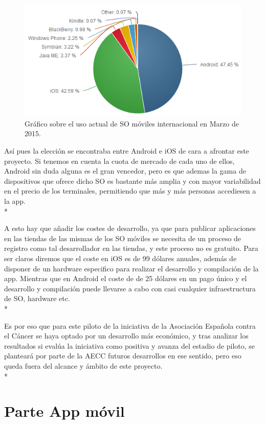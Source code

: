 \documentclass[../pfc.tex]{subfiles}
\begin{document}
	\begin{figure}[h]
		\centering
		\includegraphics[width=0.8\linewidth]{../images/usomoviles}
		\caption{Gráfico sobre el uso actual de SO móviles internacional en Marzo de 2015.}
		\label{fig:usomoviles}
	\end{figure}
	
	Así pues la elección se encontraba entre Android e iOS de cara a afrontar este proyecto. Si tenemos en cuenta la cuota de mercado de cada uno de ellos, Android sin duda alguna es el gran vencedor, pero es que ademas la gama de dispositivos que ofrece dicho SO es bastante más amplia y con mayor variabilidad en el precio de los terminales, permitiendo que más y más personas accediesen a la app. \\*
	
	A esto hay que añadir los costes de desarrollo, ya que para publicar aplicaciones en las tiendas de las mismas de los SO móviles se necesita de un proceso de registro como tal desarrollador en las tiendas, y este proceso no es gratuito. Para ser claros diremos que el coste en iOS es de 99 dólares anuales, además de disponer de un hardware especifico para realizar el desarrollo y compilación de la app. Mientras que en Android el coste de de 25 dólares en un pago único y el desarrollo y compilación puede llevarse a cabo con casi cualquier infraestructura de SO, hardware etc. \\*
	
	Es por eso que para este piloto de la iniciativa de la Asociación Española contra el Cáncer se haya optado por un desarrollo más económico, y tras analizar los resultados si evalúa la iniciativa como positiva y avanza del estadio de piloto, se planteará por parte de la AECC futuros desarrollos en ese sentido, pero eso queda fuera del alcance y ámbito de este proyecto.\\*

	\section{Parte App móvil}
	
\end{document}
